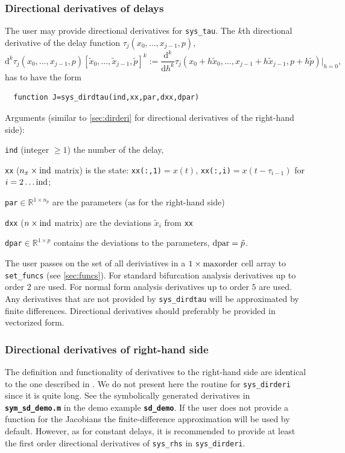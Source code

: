 \documentclass[10pt]{scrartcl}
\newcommand{\file}[1]{\textbf{\texttt{#1}}}
\renewcommand{\d}{\mathrm{d}}
\newcommand{\RR}{\mathbb{R}}
\newcommand{\blist}[1]{\mbox{\lstinline!#1!}}
\begin{document}
\subsubsection{Directional derivatives of delays}
\label{sec:dirdtau}
The user may provide directional derivatives for \blist{sys_tau}. The $k$th directional
derivative of the delay function $\tau_j(x_0,\ldots,x_{j-1},{p})$,
\begin{displaymath}
  \d^k\tau_j(x_0,\ldots,x_{j-1},{p})[\tilde{x}_0,\ldots,\tilde{x}_{j-1},\tilde{{p}}]^k:=
  \frac{\d^k}{\d h^k}\tau_j(x_0+h\tilde{x}_0,\ldots,x_{j-1}+h\tilde{x}_{j-1},{p}+h\tilde{{p}})\vert_{h=0}\mbox{,}
\end{displaymath}
 has to have the form
\begin{lstlisting}
  function J=sys_dirdtau(ind,xx,par,dxx,dpar)
\end{lstlisting}
Arguments (similar to \cref{sec:dirderi} for directional derivatives of the right-hand side):
\begin{compactitem}
\item \blist{ind} (integer $\geq1$) the number of the delay,
\item \blist{xx} ($n_x\times\blist{ind}$ matrix) is the state:
  \blist{xx(:,1)}$=x(t)$, \blist{xx(:,i)}$=x(t-\tau_{i-1})$ for
  $i=2\ldots\blist{ind}$;
\item \blist{par}$\in\RR^{1\times n_p}$ are the parameters (as for the right-hand side)
\item \blist{dxx} ($n\times\blist{ind}$ matrix) are the deviations $\tilde{x}_i$ from \blist{xx}
\item \blist{dpar}$\in\RR^{1\times
  p}$ contains the deviations to the parameters, $\blist{dpar}=\tilde{{p}}$.
\end{compactitem}
The user passes on the set of all deriviatives in a
$1\times\blist{maxorder}$ cell array to \blist{set_funcs} (see
\cref{sec:funcs}). For standard bifurcation analysis derivatives up to
order $2$ are used. For normal form analysis derivatives up to order
$5$ are used. Any derivatives that are not provided by
\blist{sys_dirdtau} will be approximated by finite differences.
Directional derivatives should preferably be provided in vectorized form.

\subsubsection{Directional derivatives of right-hand
  side}
\label{sec:sdjac}
The definition and functionality of derivatives to the right-hand side
are identical to the one described in .  We do not
present here the routine for \blist{sys_dirderi} since it is quite
long. See the symbolically generated derivatives in
\file{sym\_sd\_demo.m} in the demo example \file{sd\_demo}. If the
user does not provide a function for the Jacobians the
finite-difference approximation will be used by default.  However, as
for constant delays, it is recommended to provide at least the first
order directional derivatives of \blist{sys_rhs} in \blist{sys_dirderi}.
\end{document}
